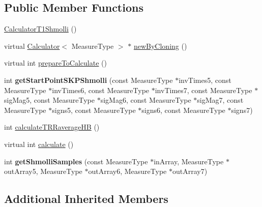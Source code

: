 \subsection*{Public Member Functions}
\begin{DoxyCompactItemize}
\item 
\hyperlink{class_ox_1_1_calculator_t1_shmolli_a693169987cfe715b58c7502b306230f5}{Calculator\-T1\-Shmolli} ()
\item 
virtual \hyperlink{class_ox_1_1_calculator}{Calculator}$<$ Measure\-Type $>$ $\ast$ \hyperlink{class_ox_1_1_calculator_t1_shmolli_a1e4e7b6f59b6a0ca4cbe3ed60452b8e9}{new\-By\-Cloning} ()
\item 
virtual int \hyperlink{class_ox_1_1_calculator_t1_shmolli_a6464c63f20ecd9de842d722e5d9d2866}{prepare\-To\-Calculate} ()
\item 
\hypertarget{class_ox_1_1_calculator_t1_shmolli_ab44f84d453405c2c61094fc4cd53449c}{int {\bfseries get\-Start\-Point\-S\-K\-P\-Shmolli} (const Measure\-Type $\ast$inv\-Times5, const Measure\-Type $\ast$inv\-Times6, const Measure\-Type $\ast$inv\-Times7, const Measure\-Type $\ast$sig\-Mag5, const Measure\-Type $\ast$sig\-Mag6, const Measure\-Type $\ast$sig\-Mag7, const Measure\-Type $\ast$signs5, const Measure\-Type $\ast$signs6, const Measure\-Type $\ast$signs7)}\label{class_ox_1_1_calculator_t1_shmolli_ab44f84d453405c2c61094fc4cd53449c}

\item 
int \hyperlink{class_ox_1_1_calculator_t1_shmolli_a2c4444b1aa40e3f01b7cf0b8e7f7672b}{calculate\-T\-R\-Raverage\-H\-B} ()
\item 
virtual int \hyperlink{class_ox_1_1_calculator_t1_shmolli_ac689ebbf27f95f6fa2559cc13a824db0}{calculate} ()
\item 
\hypertarget{class_ox_1_1_calculator_t1_shmolli_a5e2d8b626c05aebbf816cb0594295b77}{int {\bfseries get\-Shmolli\-Samples} (const Measure\-Type $\ast$in\-Array, Measure\-Type $\ast$out\-Array5, Measure\-Type $\ast$out\-Array6, Measure\-Type $\ast$out\-Array7)}\label{class_ox_1_1_calculator_t1_shmolli_a5e2d8b626c05aebbf816cb0594295b77}

\end{DoxyCompactItemize}
\subsection*{Additional Inherited Members}


